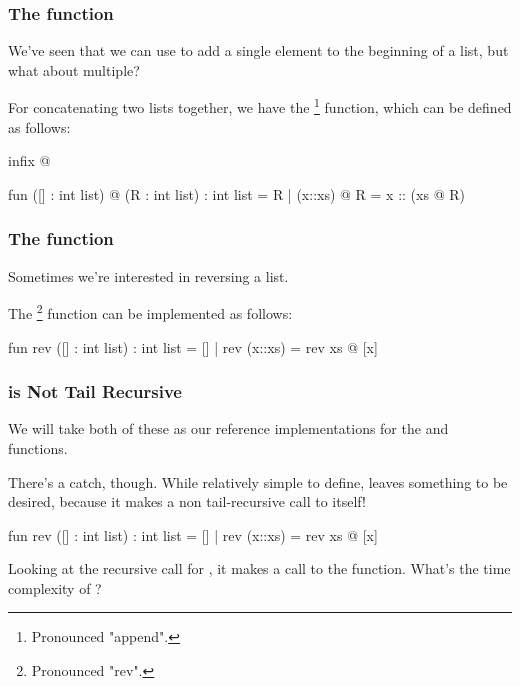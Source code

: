 \documentclass[aspectratio=169]{beamer}
\begin{document}

\begin{frame}[fragile]
  \frametitle{The  function}

  We've seen that we can use \code{::} to add a single element to the beginning of a list,
  but what about multiple?

  \pause
  \vspace{\fill}

  For concatenating two lists together, we have the \footnote{Pronounced "append".} function, which
  can be defined as follows:

  \pause
  \begin{codeblock}
    infix @

    fun ([] : int list) @ (R : int list) : int list = R
      | (x::xs) @ R = x :: (xs @ R)
  \end{codeblock}
\end{frame}

\begin{frame}[fragile]
  \frametitle{The  function}

  Sometimes we're interested in reversing a list.

  \pause
  \vspace{\fill}

  The \footnote{Pronounced "rev".} function can be implemented as follows:

  \pause
  \begin{codeblock}
    fun rev ([] : int list) : int list = []
      | rev (x::xs) = rev xs @ [x]
  \end{codeblock}
\end{frame}

\begin{frame}[fragile]
  \frametitle{ is Not Tail Recursive}

  We will take both of these as our reference implementations for the  and 
  functions.

  \pause
  \vspace{\fill}

  There's a catch, though. While relatively simple to define,  leaves something to be
  desired, because it makes a non tail-recursive call to itself!

  \begin{codeblock}
    fun rev ([] : int list) : int list = []
      | rev (x::xs) = rev xs @ [x]
  \end{codeblock}

  \pause
  \vspace{\fill}

  Looking at the recursive call for , it makes a call to the  function. What's
  the time complexity of ?
\end{frame}
\end{document}
